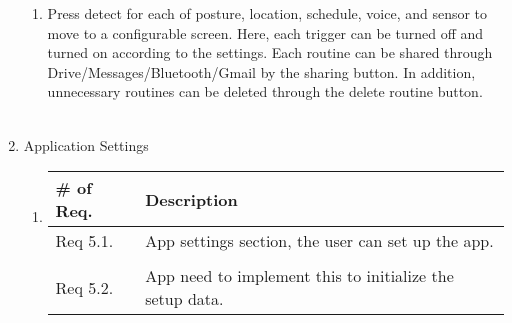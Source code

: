 \begin{enumerate}[label=\arabic*.]
\begin{enumerate}[label*={\arabic*.},ref=\theenumi.\arabic*]
              \item
                    Press detect for each of posture, location, schedule, voice, and sensor to move to a configurable screen. Here, each trigger can be turned off and turned on according to the settings. Each routine can be shared through Drive/Messages/Bluetooth/Gmail by the sharing button. In addition, unnecessary routines can be deleted through the delete routine button.\\\\
          \end{enumerate}

    \item {\large{Application Settings}}
          \begin{enumerate}[label*={\arabic*.},ref=\theenumi.\arabic*]
              \setlength{\itemindent}{0.5cm}
              \item
                    \begin{table}[H]
                        \center
                        \begin{tabular}{m{1.4cm} m{5.5cm}}
                            \toprule
                            \# of Req. & Description                               \\
                            \midrule
                            Req 5.1.   & App settings section, the user can set up
                            the app.                                               \\\\
                            Req 5.2.   & App need to implement this to initialize
                            the setup data.                                        \\
                            \bottomrule
                        \end{tabular}
                    \end{table}


\end{enumerate}
\end{enumerate}
